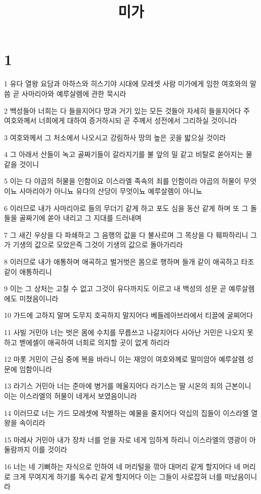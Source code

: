 

\title{미가}


\chapter{1}

\par 1 유다 열왕 요담과 아하스와 히스기야 시대에 모레셋 사람 미가에게 임한 여호와의 말씀 곧 사마리아와 예루살렘에 관한 묵시라
\par 2 백성들아 너희는 다 들을지어다 땅과 거기 있는 모든 것들아 자세히 들을지어다 주 여호와께서 너희에게 대하여 증거하시되 곧 주께서 성전에서 그리하실 것이니라
\par 3 여호와께서 그 처소에서 나오시고 강림하사 땅의 높은 곳을 밟으실 것이라
\par 4 그 아래서 산들이 녹고 골짜기들이 갈라지기를 불 앞의 밀 같고 비탈로 쏟아지는 물 같을 것이니
\par 5 이는 다 야곱의 허물을 인함이요 이스라엘 족속의 죄를 인함이라 야곱의 허물이 무엇이뇨 사마리아가 아니뇨 유다의 산당이 무엇이뇨 예루살렘이 아니뇨
\par 6 이러므로 내가 사마리아로 들의 무더기 같게 하고 포도 심을 동산 같게 하며 또 그 돌들을 골짜기에 쏟아 내리고 그 지대를 드러내며
\par 7 그 새긴 우상을 다 파쇄하고 그 음행의 값을 다 불사르며 그 목상을 다 훼파하리니 그가 기생의 값으로 모았은즉 그것이 기생의 값으로 돌아가리라
\par 8 이러므로 내가 애통하며 애곡하고 벌거벗은 몸으로 행하며 들개 같이 애곡하고 타조같이 애통하리니
\par 9 이는 그 상처는 고칠 수 없고 그것이 유다까지도 이르고 내 백성의 성문 곧 예루살렘에도 미쳤음이니라
\par 10 가드에 고하지 말며 도무지 호곡하지 말지어다 베들레아브라에서 티끌에 굴찌어다
\par 11 사빌 거민아 너는 벗은 몸에 수치를 무릅쓰고 나갈지어다 사아난 거민은 나오지 못하고 벧에셀이 애곡하여 너희로 의지할 곳이 없게 하리라
\par 12 마롯 거민이 근심 중에 복을 바라니 이는 재앙이 여호와께로 말미암아 예루살렘 성문에 임함이니라
\par 13 라기스 거민아 너는 준마에 병거를 메울지어다 라기스는 딸 시온의 죄의 근본이니 이는 이스라엘의 허물이 네게서 보였음이니라
\par 14 이러므로 너는 가드 모레셋에 작별하는 예물을 줄지어다 악십의 집들이 이스라엘 열왕을 속이리라
\par 15 마레사 거민아 내가 장차 너를 얻을 자로 네게 임하게 하리니 이스라엘의 영광이 아둘람까지 이를 것이라
\par 16 너는 네 기뻐하는 자식으로 인하여 네 머리털을 깎아 대머리 같게 할지어다 네 머리로 크게 무여지게 하기를 독수리 같게 할지어다 이는 그들이 사로잡혀 너를 떠났음이니라

